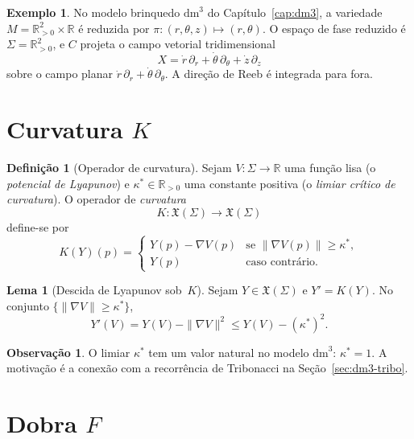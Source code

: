 \documentclass[12pt,a4paper,twoside]{book}
\theoremstyle{plain}
\theoremstyle{definition}
\newtheorem{lema}[teorema]{Lema}
\theoremstyle{definition}
\newtheorem{definicao}[teorema]{Definição}
\newtheorem{exemplo}[teorema]{Exemplo}
\newtheorem{observacao}[teorema]{Observação}
\newcommand{\R}{\mathbb{R}}
\newcommand{\dm}{\mathrm{dm}^{3}}
\begin{document}
\begin{exemplo}\label{ex:C-no-dm3}
No modelo brinquedo $\dm$ do Capítulo~\ref{cap:dm3}, a variedade
$M = \R^{2}_{>0} \times \R$ é reduzida por $\pi : (r,\theta,z) \mapsto (r,\theta)$.
O espaço de fase reduzido é $\Sigma = \R^{2}_{>0}$, e $C$ projeta o
campo vetorial tridimensional
\[
  X = \dot r\,\partial_{r} + \dot\theta\,\partial_{\theta} + \dot z\,\partial_{z}
\]
sobre o campo planar $\dot r\,\partial_{r} + \dot\theta\,\partial_{\theta}$.
A direção de Reeb é integrada para fora.
\end{exemplo}

\section{Curvatura $K$}
\label{sec:operador-K}

\begin{definicao}[Operador de curvatura]\label{def:op-K}
Sejam $V : \Sigma \to \R$ uma função lisa (o \emph{potencial de Lyapunov})
e $\kappa^{\ast} \in \R_{>0}$ uma constante positiva (o \emph{limiar
crítico de curvatura}). O operador de \emph{curvatura}
\[
  K : \mathfrak{X}(\Sigma) \to \mathfrak{X}(\Sigma)
\]
define-se por
\begin{equation}\label{eq:K-defn}
  K(Y)(p) = \begin{cases} Y(p) - \nabla V(p) & \text{se } \|\nabla V(p)\| \ge \kappa^{\ast}, \\ Y(p) & \text{caso contrário.} \end{cases}
\end{equation}
\end{definicao}

\begin{lema}[Descida de Lyapunov sob~$K$]\label{lem:K-desce}
Sejam $Y \in \mathfrak{X}(\Sigma)$ e $Y' = K(Y)$. No conjunto
$\{\|\nabla V\| \ge \kappa^{\ast}\}$,
\[
  Y'(V) = Y(V) - \|\nabla V\|^{2} \le Y(V) - (\kappa^{\ast})^{2}.
\]
\end{lema}

\begin{observacao}
O limiar $\kappa^{\ast}$ tem um valor natural no modelo $\dm$:
$\kappa^{\ast} = 1$. A motivação é a conexão com a recorrência de
Tribonacci na Seção~\ref{sec:dm3-tribo}.
\end{observacao}

\section{Dobra $F$}
\label{sec:operador-F}
\end{document}
